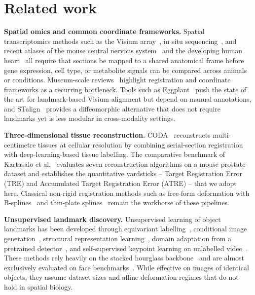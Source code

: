 \documentclass[11pt]{article}
\begin{document}
\section{Related work}

\textbf{Spatial omics and common coordinate frameworks.} Spatial transcriptomics methods such as the Visium array~\cite{stahl2016visualization}, in situ sequencing~\cite{ke2013insitu}, and recent atlases of the mouse central nervous system~\cite{chen2023atlas} and the developing human heart~\cite{asp2019spatiotemporal} all require that sections be mapped to a shared anatomical frame before gene expression, cell type, or metabolite signals can be compared across animals or conditions. Museum-scale reviews~\cite{moses2022museum,marx2021method} highlight registration and coordinate frameworks as a recurring bottleneck. Tools such as Eggplant~\cite{bergenstrahle2021eggplant} push the state of the art for landmark-based Visium alignment but depend on manual annotations, and STalign~\cite{clifton2023stalign} provides a diffeomorphic alternative that does not require landmarks yet is less modular in cross-modality settings.

\textbf{Three-dimensional tissue reconstruction.} CODA~\cite{kiemen2022coda} reconstructs multi-centimetre tissues at cellular resolution by combining serial-section registration with deep-learning-based tissue labelling. The comparative benchmark of Kartasalo et al.~\cite{kartasalo2018comparative} evaluates seven reconstruction algorithms on a mouse prostate dataset and establishes the quantitative yardsticks -- Target Registration Error (TRE) and Accumulated Target Registration Error (ATRE) -- that we adopt here. Classical non-rigid registration methods such as free-form deformation with B-splines~\cite{rueckert1999nonrigid} and thin-plate splines~\cite{bookstein1989principal} remain the workhorse of these pipelines.

\textbf{Unsupervised landmark discovery.} Unsupervised learning of object landmarks has been developed through equivariant labelling~\cite{thewlis2017unsupervised}, conditional image generation~\cite{jakab2018conditional}, structural representation learning~\cite{zhang2018unsupervised}, domain adaptation from a pretrained detector~\cite{sanchez2019object}, and self-supervised keypoint learning on unlabelled video~\cite{jakab2020selfsupervised}. These methods rely heavily on the stacked hourglass backbone~\cite{newell2016stacked} and are almost exclusively evaluated on face benchmarks~\cite{liu2015celeba,zhang2016learning,kostinger2011aflw}. While effective on images of identical objects, they assume dataset sizes and affine deformation regimes that do not hold in spatial biology.
\end{document}
